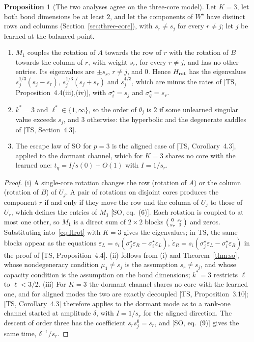 \documentclass[11pt]{article}
\newcommand{\TS}{\textsf{TS}}
\newcommand{\SO}{\textsf{SO}}
\newcommand{\ts}[1]{[\TS, #1]}
\newcommand{\so}[1]{[\SO, #1]}
\theoremstyle{definition}
\newtheorem{proposition}[theorem]{Proposition}
\numberwithin{equation}{section}
\begin{document}
\begin{proposition}[The two analyses agree on the three-core model]\label{prop:dictionary}
Let $K=3$, let both bond dimensions be at least $2$, and let the components of $W^\star$ have distinct rows and columns (Section~\ref{sec:three-core}), with $s_r\neq s_j$ for every $r\neq j$; let $j$ be learned at the balanced point.
\begin{enumerate}[label=(\roman*),nosep]
\item $M_1$ couples the rotation of $A$ towards the row of $r$ with the rotation of $B$ towards the column of $r$, with weight $s_r$, for every $r\neq j$, and has no other entries. Its eigenvalues are $\pm s_r$, $r\neq j$, and $0$. Hence $H_{\rm rot}$ has the eigenvalues $s_j^{1/3}(s_j-s_r)$, $s_j^{1/3}(s_j+s_r)$ and $s_j^{4/3}$, which are minus the rates of \ts{Proposition~4.4(iii),(iv)}, with $\sigma^\star_i=s_j$ and $\sigma^\star_q=s_r$.
\item $k^*=3$ and $\ell^*\in\{1,\infty\}$, so the order of $\theta_j$ is $2$ if some unlearned singular value exceeds $s_j$, and $3$ otherwise: the hyperbolic and the degenerate saddles of \ts{Section~4.3}.
\item The escape law of \SO{} for $p=3$ is the aligned case of \ts{Corollary~4.3}, applied to the dormant channel, which for $K=3$ shares no core with the learned one: $t_\eta=I/s(0)+O(1)$ with $I=1/s_r$.
\end{enumerate}
\end{proposition}

\begin{proof}
(i) A single-core rotation changes the row (rotation of $A$) or the column (rotation of $B$) of $U_j$. A pair of rotations on disjoint cores produces the component $r$ if and only if they move the row and the column of $U_j$ to those of $U_r$, which defines the entries of $M_1$ \so{eq.~(6)}. Each rotation is coupled to at most one other, so $M_1$ is a direct sum of $2\times2$ blocks $\begin{psmallmatrix}0&s_r\\s_r&0\end{psmallmatrix}$ and zeros. Substituting into~\eqref{eq:Hrot} with $K=3$ gives the eigenvalues; in \TS, the same blocks appear as the equations $\dot\varepsilon_L=s_i(\sigma^\star_j\varepsilon_R-\sigma^\star_i\varepsilon_L)$, $\dot\varepsilon_R=s_i(\sigma^\star_j\varepsilon_L-\sigma^\star_i\varepsilon_R)$ in the proof of \ts{Proposition~4.4}. (ii) follows from (i) and Theorem~\ref{thm:so}, whose nondegeneracy condition $\mu_1\neq s_j$ is the assumption $s_r\neq s_j$, and whose capacity condition is the assumption on the bond dimensions; $k^*=3$ restricts $\ell$ to $\ell<3/2$. (iii) For $K=3$ the dormant channel shares no core with the learned one, and for aligned modes the two are exactly decoupled \ts{Proposition~3.10}; \ts{Corollary~4.3} therefore applies to the dormant mode as to a rank-one channel started at amplitude $\delta$, with $I=1/s_r$ for the aligned direction. The descent of order three has the coefficient $s_rs_j^{0}=s_r$, and \so{eq.~(9)} gives the same time, $\delta^{-1}/s_r$.
\end{proof}
\end{document}
